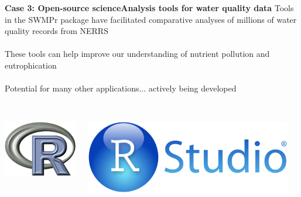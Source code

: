 \documentclass[serif]{beamer}\usepackage[]{graphicx}\usepackage[]{color}
\begin{document}
\begin{frame}{\textbf{Case 3: Open-source science}}{\textbf{Analysis tools for water quality data}}
\onslide<+->
Tools in the SWMPr package have facilitated comparative analyses of millions of water quality records from NERRS \\~\\
These tools can help improve our understanding of nutrient pollution and eutrophication \\~\\
\onslide<+->
Potential for many other applications... actively being developed \\~\\
\begin{columns}
\begin{column}{0.25\textwidth}
\centerline{\includegraphics[width = \textwidth]{fig/Rlogo.png}}
\end{column}
\begin{column}{0.25\textwidth}
\centerline{\includegraphics[width = \textwidth]{fig/RStudio.png}}
\end{column}
\begin{column}{0.25\textwidth}

\end{column}
\end{columns}
\end{frame}
\end{document}
